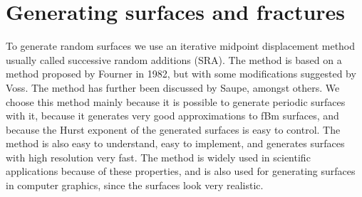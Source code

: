 \chapter{Generating surfaces and fractures\label{chap:generating_surfaces}}
%
%

To generate random surfaces we use an iterative midpoint displacement method usually called successive random additions (SRA). The method is based on a method proposed by Fourner in 1982\cite{fournier1982computer}, but with some modifications suggested by Voss\cite{voss1985random, voss1988fractals}. The method has further been discussed by Saupe\cite{saupe1988algorithms}, amongst others. We choose this method mainly because it is possible to generate periodic surfaces with it, because it generates very good approximations to fBm surfaces\cite{zhou2005comparison}, and because the Hurst exponent of the generated surfaces is easy to control. The method is also easy to understand, easy to implement, and generates surfaces with high resolution very fast. The method is widely used in scientific applications because of these properties, and is also used for generating surfaces in computer graphics, since the surfaces look very realistic.